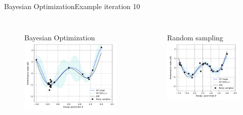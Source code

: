 \documentclass{beamer}
\begin{document}
\begin{frame}{Bayesian Optimization}{Example}
\centering
iteration 10
\begin{columns}
   \begin{figure}
   Bayesian Optimization
   \includegraphics[width=\textwidth]{img/BO/BO_fit_17.pdf}
   \end{figure}  
   \begin{figure}
 Random sampling
   \includegraphics[width=\textwidth]{img/GP_fit/GP_fit_20.pdf}
   \end{figure}  
\end{columns}
\end{frame}


\begin{frame}{}{}
\begin{center}
\huge{}
\end{center}
\end{frame}

	
\end{document}

